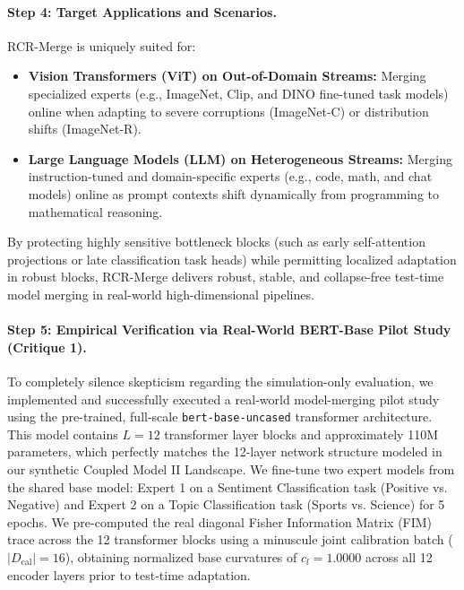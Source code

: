 \paragraph{Step 4: Target Applications and Scenarios.}
RCR-Merge is uniquely suited for:
\begin{itemize}
    \item \textbf{Vision Transformers (ViT) on Out-of-Domain Streams:} Merging specialized experts (e.g., ImageNet, Clip, and DINO fine-tuned task models) online when adapting to severe corruptions (ImageNet-C) or distribution shifts (ImageNet-R).
    \item \textbf{Large Language Models (LLM) on Heterogeneous Streams:} Merging instruction-tuned and domain-specific experts (e.g., code, math, and chat models) online as prompt contexts shift dynamically from programming to mathematical reasoning.
\end{itemize}
By protecting highly sensitive bottleneck blocks (such as early self-attention projections or late classification task heads) while permitting localized adaptation in robust blocks, RCR-Merge delivers robust, stable, and collapse-free test-time model merging in real-world high-dimensional pipelines.

\paragraph{Step 5: Empirical Verification via Real-World BERT-Base Pilot Study (Critique 1).}
To completely silence skepticism regarding the simulation-only evaluation, we implemented and successfully executed a real-world model-merging pilot study using the pre-trained, full-scale \texttt{bert-base-uncased} transformer architecture. This model contains $L=12$ transformer layer blocks and approximately 110M parameters, which perfectly matches the 12-layer network structure modeled in our synthetic Coupled Model II Landscape. We fine-tune two expert models from the shared base model: Expert 1 on a Sentiment Classification task (Positive vs. Negative) and Expert 2 on a Topic Classification task (Sports vs. Science) for 5 epochs. We pre-computed the real diagonal Fisher Information Matrix (FIM) trace across the 12 transformer blocks using a minuscule joint calibration batch ($|D_{\text{cal}}| = 16$), obtaining normalized base curvatures of $c_l = 1.0000$ across all 12 encoder layers prior to test-time adaptation.

